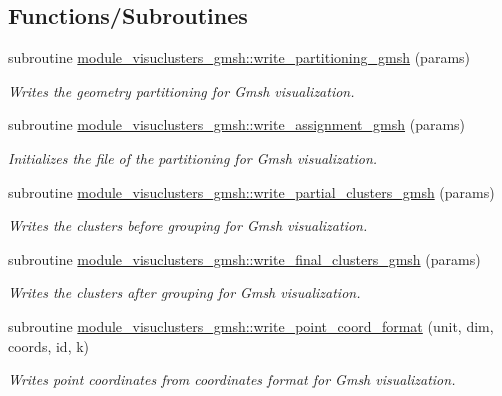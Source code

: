 \subsection*{Functions/\+Subroutines}
\begin{DoxyCompactItemize}
\item 
subroutine \hyperlink{namespacemodule__visuclusters__gmsh_a2ffd04d2e2dcdda290446affaf3a76dc}{module\+\_\+visuclusters\+\_\+gmsh\+::write\+\_\+partitioning\+\_\+gmsh} (params)
\begin{DoxyCompactList}\small\item\em Writes the geometry partitioning for Gmsh visualization. \end{DoxyCompactList}\item 
subroutine \hyperlink{namespacemodule__visuclusters__gmsh_a3771400a4e195904654e041eef83247f}{module\+\_\+visuclusters\+\_\+gmsh\+::write\+\_\+assignment\+\_\+gmsh} (params)
\begin{DoxyCompactList}\small\item\em Initializes the file of the partitioning for Gmsh visualization. \end{DoxyCompactList}\item 
subroutine \hyperlink{namespacemodule__visuclusters__gmsh_af04ca060cedb92fb755fd6cbb1330011}{module\+\_\+visuclusters\+\_\+gmsh\+::write\+\_\+partial\+\_\+clusters\+\_\+gmsh} (params)
\begin{DoxyCompactList}\small\item\em Writes the clusters before grouping for Gmsh visualization. \end{DoxyCompactList}\item 
subroutine \hyperlink{namespacemodule__visuclusters__gmsh_a3fe1790e0267b255e689ead80e6c8ca8}{module\+\_\+visuclusters\+\_\+gmsh\+::write\+\_\+final\+\_\+clusters\+\_\+gmsh} (params)
\begin{DoxyCompactList}\small\item\em Writes the clusters after grouping for Gmsh visualization. \end{DoxyCompactList}\item 
subroutine \hyperlink{namespacemodule__visuclusters__gmsh_ab3a87863baf4bd33953b9aa7950d5d26}{module\+\_\+visuclusters\+\_\+gmsh\+::write\+\_\+point\+\_\+coord\+\_\+format} (unit, dim, coords, id, k)
\begin{DoxyCompactList}\small\item\em Writes point coordinates from coordinates format for Gmsh visualization. \end{DoxyCompactList}\item 

\end{DoxyCompactItemize}
